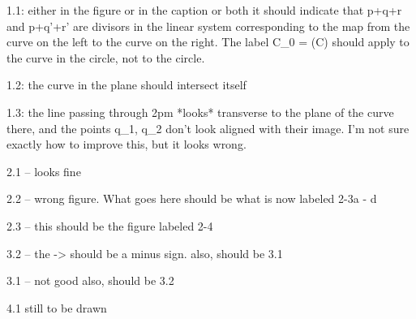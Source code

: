 1.1: either in the figure or in the caption or both it should indicate that p+q+r and p+q'+r' are divisors in the linear system
corresponding to the map from the curve on the left to the curve on the right. The label C_0 = \phi(C) should apply to the curve in the circle, not
to the circle.

1.2: the curve in the plane should intersect itself

1.3: the line passing through 2pm *looks* transverse to the plane of the curve there, and the points q_1, q_2 don't look aligned with their image. I'm not sure exactly how to improve this, but it looks wrong.

2.1 -- looks fine

2.2 -- wrong figure. What goes here should be what is now labeled 2-3a - d

2.3 -- this should be the figure labeled 2-4 

3.2 --  the -> should be a minus sign. also, should be 3.1

3.1 -- not good also, should be 3.2

4.1 still to be drawn



